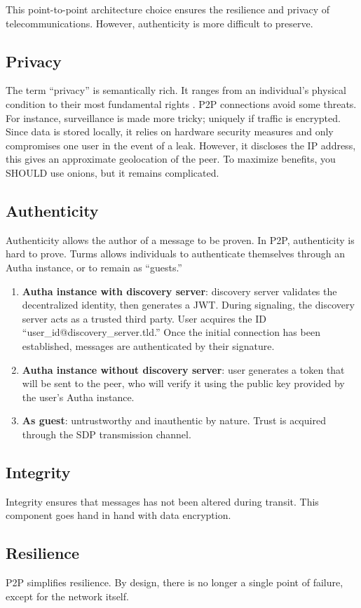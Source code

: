 This point-to-point architecture choice ensures the resilience and privacy of 
telecommunications. However, authenticity is more difficult to preserve.

\subsection{Privacy}

The term \enquote{privacy} is semantically rich. It ranges from an individual's 
physical condition to their most fundamental rights \cite{rfc6973}. P2P 
connections avoid some threats. For instance, surveillance is made more tricky; 
uniquely if traffic is encrypted. Since data is stored locally, it relies on 
hardware security measures and only compromises one user in the event of a 
leak. However, it discloses the IP address, this gives an approximate 
geolocation of the peer. To maximize benefits, you SHOULD use onions, but it 
remains complicated.

\subsection{Authenticity}

Authenticity allows the author of a message to be proven. In P2P, authenticity 
is hard to prove. Turms allows individuals to authenticate themselves through 
an Autha instance, or to remain as \enquote{guests.}

\begin{enumerate}
    \item \textbf{Autha instance with discovery server}: discovery server 
validates the decentralized identity, then generates a JWT. During signaling, 
the discovery server acts as a trusted third party. User acquires the ID 
\enquote{user\_id@discovery\_server.tld.} Once the initial connection has been 
established, messages are authenticated by their signature.
    \item \textbf{Autha instance without discovery server}: user generates a 
token that will be sent to the peer, who will verify it using the public key 
provided by the user's Autha instance.
    \item \textbf{As guest}: untrustworthy and inauthentic by nature. Trust is 
acquired through the SDP transmission channel.
\end{enumerate}

\subsection{Integrity}

Integrity ensures that messages has not been altered during transit. This 
component goes hand in hand with data encryption.

\subsection{Resilience}

P2P simplifies resilience. By design, there is no longer a single point of 
failure, except for the network itself.